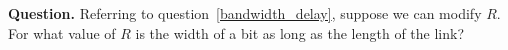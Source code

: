 \textbf{Question.} Referring to question~\ref{bandwidth_delay}, suppose
we can modify \(R\). For what value of \(R\) is the width of a bit as
long as the length of the link?
